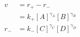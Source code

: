 \begin{eqnarray}\label{eqn:flux-def}
v & =r_+-r_- \\
&=  k_+[A]^{\gamma_A}[B]^{\gamma_B} \\
r_-  & =  k_-[C]^{\gamma_C}[D]^{\gamma_D} \\
\end{eqnarray}